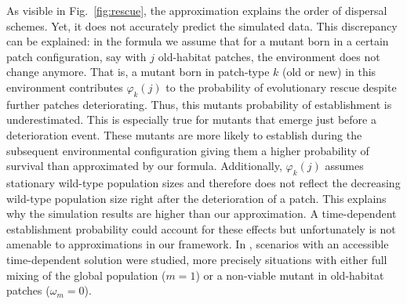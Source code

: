 \documentclass[a4paper,11pt]{article}
\newcommand{\chg}[1]{\textcolor{change}{#1}}
\begin{document}
As visible in Fig.~\ref{fig:rescue}, the approximation explains the \chg{order of dispersal schemes}. Yet, it does not accurately predict the simulated data. This discrepancy can be explained: in the formula we \chg{assume that for a mutant born in a certain patch configuration, say with $j$ old-habitat patches, the environment does not change anymore. That is, a mutant born in patch-type $k$ (old or new) in this environment contributes $\varphi_{k}(j)$ to the probability of evolutionary rescue despite further patches deteriorating. Thus, this mutants probability of establishment is underestimated. This is especially true for mutants that emerge just before a deterioration event. These mutants are more likely to establish during the subsequent environmental configuration giving them a higher probability of survival than approximated by our formula. Additionally, $\varphi_k(j)$ assumes stationary wild-type population sizes and therefore does not reflect the decreasing wild-type population size right after the deterioration of a patch.} 
This explains why the simulation results are higher than our approximation. 
\chg{A time-dependent establishment probability could account for these effects but unfortunately is not amenable to approximations in our framework.}
\chg{In \citet{uecker_2014}, scenarios with an accessible time-dependent solution were studied, more precisely situations with either full mixing of the global population ($m=1$) or a non-viable mutant in old-habitat patches ($\omega_m=0$).}
\end{document}
